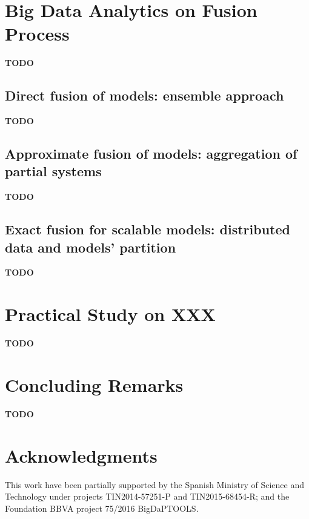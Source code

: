 \documentclass[3p,review]{elsarticle}
\newcommand{\TODO}{\textbf{TODO}}
\begin{document}
\section{Big Data Analytics on Fusion Process}\label{sec:fusion}

\TODO

\subsection{Direct fusion of models: ensemble approach}\label{subsec:ensemble}

\TODO

\subsection{Approximate fusion of models: aggregation of partial systems}\label{subsec:submodels}

\TODO

\subsection{Exact fusion for scalable models: distributed data and models' partition}\label{subsec:exact}

\TODO

\section{Practical Study on XXX}\label{sec:exp}

\TODO



\section{Concluding Remarks}\label{sec:conclusions}

\TODO

\section*{Acknowledgments}\label{sec:ack}

This work have been partially supported by the Spanish Ministry of Science and Technology under projects TIN2014-57251-P and TIN2015-68454-R; and the Foundation BBVA project 75/2016 BigDaPTOOLS.




\end{document}
